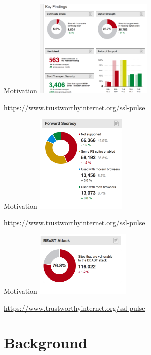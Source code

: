 \documentclass[hyperref={draft}]{beamer}
\begin{document}
\begin{frame}{Motivation}
    \includegraphics[height=180px]{sslpulse2}

    \vspace{10px}

    \tiny
    \url{https://www.trustworthyinternet.org/ssl-pulse}
\end{frame}
\begin{frame}{Motivation}
    \includegraphics[height=180px]{sslpulse3}

    \vspace{10px}

    \tiny
    \url{https://www.trustworthyinternet.org/ssl-pulse}
\end{frame}
\begin{frame}{Motivation}
    \includegraphics[height=120px]{sslpulse4}

    \vspace{10px}

    \tiny
    \url{https://www.trustworthyinternet.org/ssl-pulse}
\end{frame}


\section{Background}
\end{document}
